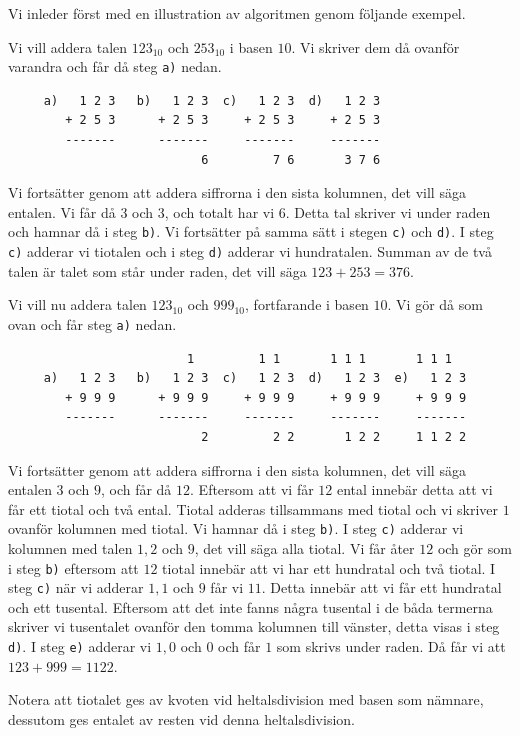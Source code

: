 Vi inleder först med en illustration av algoritmen genom följande exempel.
\begin{example}
  Vi vill addera talen \(123_{10}\) och \(253_{10}\) i basen \(10\).
  Vi skriver dem då ovanför varandra och får då steg \verb'a)' nedan.
  \begin{verbatim}
     a)   1 2 3   b)   1 2 3  c)   1 2 3  d)   1 2 3
        + 2 5 3      + 2 5 3     + 2 5 3     + 2 5 3
        -------      -------     -------     -------
                           6         7 6       3 7 6
  \end{verbatim}
  Vi fortsätter genom att addera siffrorna i den sista kolumnen, det vill
  säga entalen.
  Vi får då \(3\) och \(3\), och totalt har vi \(6\).
  Detta tal skriver vi under raden och hamnar då i steg \verb'b)'.
  Vi fortsätter på samma sätt i stegen \verb'c)' och \verb'd)'.
  I steg \verb'c)' adderar vi tiotalen och i steg \verb'd)' adderar vi
  hundratalen.
  Summan av de två talen är talet som står under raden, det vill säga
  \(123+253=376\).
\end{example}
\begin{example}\label{ex:AdderaMedRest}
  Vi vill nu addera talen \(123_{10}\) och \(999_{10}\), fortfarande i basen
  \(10\).
  Vi gör då som ovan och får steg \verb'a)' nedan.
  \begin{verbatim}
                         1         1 1       1 1 1       1 1 1
     a)   1 2 3   b)   1 2 3  c)   1 2 3  d)   1 2 3  e)   1 2 3
        + 9 9 9      + 9 9 9     + 9 9 9     + 9 9 9     + 9 9 9
        -------      -------     -------     -------     -------
                           2         2 2       1 2 2     1 1 2 2
  \end{verbatim}
  Vi fortsätter genom att addera siffrorna i den sista kolumnen, det vill
  säga entalen \(3\) och \(9\), och får då \(12\).
  Eftersom att vi får \(12\) ental innebär detta att vi får ett tiotal och
  två ental.
  Tiotal adderas tillsammans med tiotal och vi skriver \(1\) ovanför kolumnen
  med tiotal.
  Vi hamnar då i steg \verb'b)'.
  I steg \verb'c)' adderar vi kolumnen med talen \(1, 2\) och \(9\), det vill
  säga alla tiotal.
  Vi får åter \(12\) och gör som i steg \verb'b)' eftersom att \(12\) tiotal
  innebär att vi har ett hundratal och två tiotal.
  I steg \verb'c)' när vi adderar \(1,1\) och \(9\) får vi \(11\).
  Detta innebär att vi får ett hundratal och ett tusental.
  Eftersom att det inte fanns några tusental i de båda termerna skriver vi
  tusentalet ovanför den tomma kolumnen till vänster, detta visas i steg
  \verb'd)'.
  I steg \verb'e)' adderar vi \(1,0\) och \(0\) och får \(1\) som skrivs
  under raden.
  Då får vi att \(123+999=1122\).
\end{example}
\begin{remark}
  Notera att tiotalet ges av kvoten vid heltalsdivision med basen som
  nämnare, dessutom ges entalet av resten vid denna heltalsdivision.
\end{remark}

